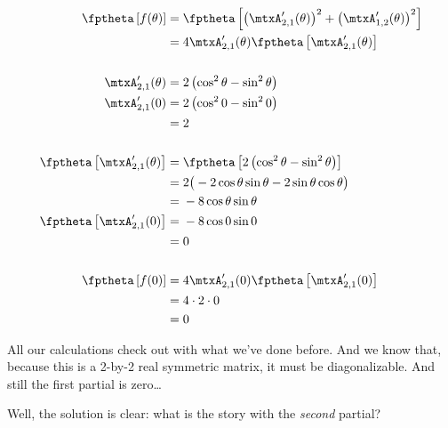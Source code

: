 \begin{equation*}
  \begin{split}
      \fptheta \left[f(\theta)\right]
    ={}&
      \fptheta \left[
        \left( \mtxA'_{2, 1}(\theta) \right)^2
        + \left( \mtxA'_{1, 2}(\theta) \right)^2
      \right]
    \\
    ={}&
      4
      \mtxA'_{2, 1}(\theta)
      \fptheta \left[ \mtxA'_{2, 1}(\theta) \right] \\
    \\
      \mtxA'_{2, 1}(\theta)
    ={}&
      2 \left( \cos^2\theta - \sin^2\theta \right) \\
      \mtxA'_{2, 1}(0)
    ={}&
        2 \left( \cos^2 0 - \sin^2 0 \right) \\
    ={}&
      2 \\
    \\
      \fptheta \left[ \mtxA'_{2, 1}(\theta) \right]
    ={}&
      \fptheta \left[
        2 \left( \cos^2\theta - \sin^2\theta \right)
      \right] \\
    ={}&
      2 \big( -2\cos\theta \sin\theta - 2\sin\theta\cos\theta \big) \\
    ={}&
      -8 \cos\theta \sin\theta \\
      \fptheta \left[ \mtxA'_{2, 1}(0) \right]
    ={}&
      -8 \cos 0 \sin 0 \\
    ={}&
      0 \\
    \\
      \fptheta \left[f(0)\right]
    ={}&
      4
      \mtxA'_{2, 1}(0)
      \fptheta \left[ \mtxA'_{2, 1}(0) \right] \\
    ={}&
      4 \cdot 2 \cdot 0 \\
    ={}& 0
  \end{split}
\end{equation*}

All our calculations check out with what we've done before. And we know
that, because this is a 2-by-2 real symmetric matrix, it must be
diagonalizable. And still the first partial is zero\dots

Well, the solution is clear: what is the story with the \textit{second}
partial?

